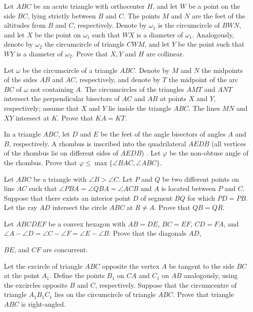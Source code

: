 \item[\textbf{G1.}]
Let 
$ABC$
 be an acute triangle with orthocenter 
$H$, 
 and let 
$W$
 be a point on the side 
$BC$, 
 lying strictly between 
$B$
 and 
$C$.
 The points 
$M$
 and 
$N$
 are the feet of the altitudes from 
$B$
 and 
$C$, 
 respectively. Denote by 
$\omega_1$
 is the circumcircle of 
$BWN$, 
 and let 
$X$
 be the point on 
$\omega_1$
 such that 
$WX$
 is a diameter of 
$\omega_1$.
 Analogously, denote by 
$\omega_2$
 the circumcircle of triangle 
$CWM$, 
 and let 
$Y$
 be the point such that 
$WY$
 is a diameter of 
$\omega_2$.
 Prove that 
$X,Y$
 and 
$H$
 are collinear.

\item[\textbf{G2.}]
Let 
$\omega$
 be the circumcircle of a triangle 
$ABC$.
 Denote by 
$M$
 and 
$N$
 the midpoints of the sides 
$AB$
 and 
$AC$, 
 respectively, and denote by 
$T$
 the midpoint of the arc 
$BC$
 of 
$\omega$
 not containing 
$A$.
 The circumcircles of the triangles 
$AMT$
 and 
$ANT$
 intersect the perpendicular bisectors of 
$AC$
 and 
$AB$
 at points 
$X$
 and 
$Y$, 
 respectively; assume that 
$X$
 and 
$Y$
 lie inside the triangle 
$ABC$.
 The lines 
$MN$
 and 
$XY$
 intersect at 
$K$.
 Prove that 
$KA=KT$.

\item[\textbf{G3.}]
In a triangle 
$ABC$, 
 let 
$D$
 and 
$E$
 be the feet of the angle bisectors of angles 
$A$
 and 
$B$, 
 respectively. A rhombus is inscribed into the quadrilateral 
$AEDB$
 (all vertices of the rhombus lie on different sides of 
$AEDB$)
. Let 
$\varphi$
 be the non-obtuse angle of the rhombus. Prove that 
$\varphi \le \max \{  \angle BAC, \angle ABC  \}$.

\item[\textbf{G4.}]
Let 
$ABC$
 be a triangle with 
$\angle B > \angle C$.
 Let 
$P$
 and 
$Q$
 be two different points on line 
$AC$
 such that 
$\angle PBA = \angle QBA = \angle ACB $
 and 
$A$
 is located between 
$P$
 and 
$C$.
 Suppose that there exists an interior point 
$D$
 of segment 
$BQ$
 for which 
$PD=PB$.
 Let the ray 
$AD$
 intersect the circle 
$ABC$
 at 
$R \neq A$.
 Prove that 
$QB = QR$.

\item[\textbf{G5.}]
Let 
$ABCDEF$
 be a convex hexagon with 
$AB=DE$, 
$BC=EF$,
$CD=FA$, 
 and 
$\angle A-\angle D = \angle C -\angle F = \angle E -\angle B$.
 Prove that the diagonals 
$AD$, 
 
$BE$, 
 and 
$CF$
 are concurrent.

\item[\textbf{G6.}]
Let the excircle of triangle 
$ABC$
 opposite the vertex 
$A$
 be tangent to the side 
$BC$
 at the point 
$A_1$.
 Define the points 
$B_1$
 on 
$CA$
 and 
$C_1$
 on 
$AB$
 analogously, using the excircles opposite 
$B$
 and 
$C$, 
 respectively. Suppose that the circumcentre of triangle 
$A_1B_1C_1$
 lies on the circumcircle of triangle 
$ABC$.
 Prove that triangle 
$ABC$
 is right-angled.

